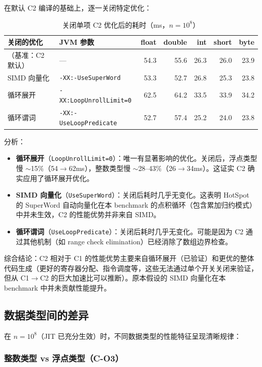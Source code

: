 \documentclass[12pt,a4paper]{article}
\begin{document}
在默认 C2 编译的基础上，逐一关闭特定优化：

\begin{table}[H]
\centering
\begin{tabular}{l l r r r r r}
\toprule
关闭的优化 & JVM 参数 & float & double & int & short & byte \\
\midrule
（基准：C2 默认）  & —                          & 54.3  & 55.6  & 26.3  & 26.0  & 23.9  \\
SIMD 向量化        & \texttt{-XX:-UseSuperWord}  & 53.3  & 52.7  & 26.8  & 25.3  & 23.8  \\
循环展开            & \texttt{-XX:LoopUnrollLimit=0} & 62.5  & 64.2  & 33.5  & 33.9  & 34.2  \\
循环谓词            & \texttt{-XX:-UseLoopPredicate} & 52.7  & 57.4  & 25.2  & 24.0  & 23.8  \\
\bottomrule
\end{tabular}
\caption{关闭单项 C2 优化后的耗时（ms，$n=10^8$）}
\end{table}

分析：
\begin{itemize}
  \item \textbf{循环展开}（\texttt{LoopUnrollLimit=0}）：唯一有显著影响的优化。关闭后，浮点类型慢 ${\sim}$15\%（54$\to$62ms），整数类型慢 ${\sim}$28--43\%（26$\to$34ms）。这证实 C2 确实应用了循环展开优化。
  \item \textbf{SIMD 向量化}（\texttt{UseSuperWord}）：关闭后耗时几乎无变化。这表明 HotSpot 的 SuperWord 自动向量化在本 benchmark 的点积循环（包含累加归约模式）中并未生效，C2 的性能优势并非来自 SIMD。
  \item \textbf{循环谓词}（\texttt{UseLoopPredicate}）：关闭后耗时几乎无变化。可能是因为 C2 通过其他机制（如 range check elimination）已经消除了数组边界检查。
\end{itemize}

综合结论：C2 相对于 C1 的性能优势主要来自循环展开（已验证）和更优的整体代码生成（更好的寄存器分配、指令调度等，这些无法通过单个开关关闭来验证，但从 C1$\to$C2 的巨大加速比可以推断）。原本假设的 SIMD 向量化在本 benchmark 中并未贡献性能提升。

\subsection{数据类型间的差异}

在 $n=10^8$（JIT 已充分生效）时，不同数据类型的性能特征呈现清晰规律：

\subsubsection*{整数类型 vs 浮点类型（C-O3）}
\end{document}
